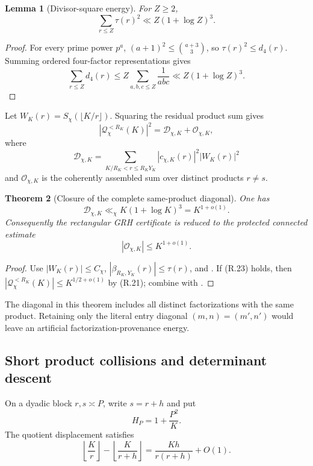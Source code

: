 \documentclass[11pt]{article}
\newtheorem{theorem}{Theorem}[section]
\newtheorem{lemma}[theorem]{Lemma}
\theoremstyle{definition}
\theoremstyle{remark}
\newcommand{\abs}[1]{\left\lvert#1\right\rvert}
\begin{document}
\begin{lemma}[Divisor-square energy]
\label{lem:rectangular-divisor-square}
For $Z\ge2$,
\[
 \sum_{r\le Z}\tau(r)^2\ll Z(1+\log Z)^3.
 \tag{R.20}
\]
\end{lemma}

\begin{proof}
For every prime power $p^a$, $(a+1)^2\le\binom{a+3}{3}$, so
$\tau(r)^2\le d_4(r)$.  Summing ordered four-factor representations gives
\[
 \sum_{r\le Z}d_4(r)
 \le Z\sum_{a,b,c\le Z}\frac1{abc}
 \ll Z(1+\log Z)^3.
\]
\end{proof}

Let $W_K(r)=S_\chi(\lfloor K/r\rfloor)$.  Squaring the residual product sum
gives
\[
 |\mathcal Q_\chi^{<R_K}(K)|^2
 =\mathcal D_{\chi,K}+\mathcal O_{\chi,K},
 \tag{R.21}
\]
where
\[
 \mathcal D_{\chi,K}
 =\sum_{K/R_K<r\le R_KY_K}|c_{\chi,K}(r)|^2|W_K(r)|^2
\]
and $\mathcal O_{\chi,K}$ is the coherently assembled sum over distinct
products $r\ne s$.

\begin{theorem}[Closure of the complete same-product diagonal]
\label{thm:rectangular-product-diagonal}
One has
\[
 \boxed{
 \mathcal D_{\chi,K}\ll_\chi K(1+\log K)^3=K^{1+o(1)}.}
 \tag{R.22}
\]
Consequently the rectangular GRH certificate is reduced to the protected
connected estimate
\[
 \boxed{\abs{\mathcal O_{\chi,K}}\le K^{1+o(1)}.}
 \tag{R.23}
\]
\end{theorem}

\begin{proof}
Use $|W_K(r)|\le C_\chi$, $|\beta_{R_K,Y_K}(r)|\le\tau(r)$, and
.  If \textup{(R.23)} holds, then
$|\mathcal Q_\chi^{<R_K}(K)|\le K^{1/2+o(1)}$ by \textup{(R.21)}; combine
with .
\end{proof}

The diagonal in this theorem includes all distinct factorizations with the
same product.  Retaining only the literal entry diagonal
$(m,n)=(m',n')$ would leave an artificial factorization-provenance energy.

\subsection{Short product collisions and determinant descent}

On a dyadic block $r,s\asymp P$, write $s=r+h$ and put
\[
 H_P=1+\frac{P^2}{K}.
 \tag{R.24}
\]
The quotient displacement satisfies
\[
 \left\lfloor\frac{K}{r}\right\rfloor
 -\left\lfloor\frac{K}{r+h}\right\rfloor
 =\frac{Kh}{r(r+h)}+O(1).
 \tag{R.25}
\]
\end{document}
